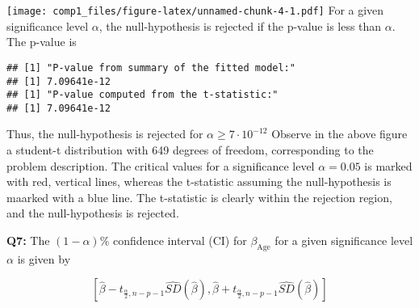 \documentclass[]{article}
\newenvironment{Shaded}{\begin{snugshade}}{\end{snugshade}}
\newcommand{\KeywordTok}[1]{\textcolor[rgb]{0.13,0.29,0.53}{\textbf{#1}}}
\newcommand{\DataTypeTok}[1]{\textcolor[rgb]{0.13,0.29,0.53}{#1}}
\newcommand{\DecValTok}[1]{\textcolor[rgb]{0.00,0.00,0.81}{#1}}
\newcommand{\FloatTok}[1]{\textcolor[rgb]{0.00,0.00,0.81}{#1}}
\newcommand{\StringTok}[1]{\textcolor[rgb]{0.31,0.60,0.02}{#1}}
\newcommand{\CommentTok}[1]{\textcolor[rgb]{0.56,0.35,0.01}{\textit{#1}}}
\newcommand{\OperatorTok}[1]{\textcolor[rgb]{0.81,0.36,0.00}{\textbf{#1}}}
\newcommand{\NormalTok}[1]{#1}
\begin{document}
\texttt{[image: comp1\_files/figure-latex/unnamed-chunk-4-1.pdf]} For a
given significance level \(\alpha\), the null-hypothesis is rejected if
the p-value is less than \(\alpha\). The p-value is

\begin{verbatim}
## [1] "P-value from summary of the fitted model:"
## [1] 7.09641e-12
## [1] "P-value computed from the t-statistic:"
## [1] 7.09641e-12
\end{verbatim}

Thus, the null-hypothesis is rejected for \(\alpha \ge 7\cdot10^{-12}\)
Observe in the above figure a student-t distribution with 649 degrees of
freedom, corresponding to the problem description. The critical values
for a significance level \(\alpha = 0.05\) is marked with red, vertical
lines, whereas the t-statistic assuming the null-hypothesis is maarked
with a blue line. The t-statistic is clearly within the rejection
region, and the null-hypothesis is rejected.

\textbf{Q7:} The \((1-\alpha)\%\) confidence interval (CI) for
\(\beta_{\text{Age}}\) for a given significance level \(\alpha\) is
given by

\[
[\hat{\beta}-t_{\frac{\alpha}{2},n-p-1}\hat{SD}(\hat{\beta}),\hat{\beta}+t_{\frac{\alpha}{2},n-p-1}\hat{SD}(\hat{\beta})]
\]

\begin{Shaded}
\end{Shaded}
\end{document}

